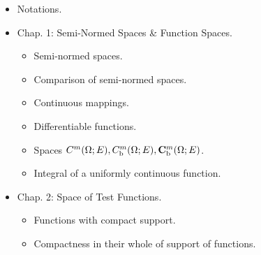 \documentclass{article}
\begin{document}
\begin{enumerate}
\begin{itemize}
		{\bf Utility of distributions.} Main advantage of distribution: distributions provide derivatives of all continuous or integrable functions, even those which are not differentiable, \& thus broaden scope of application of differential calculus. Especially useful for solving PDEs.
		
		To this end, a family of objects, the distributions, is defined, with following properties:
		\begin{itemize}
			\item Any continuous function is a distribution.
			\item Any distribution has partial derivatives, which are distributions.
			\item For a differentiable function, find conventional derivatives.
			\item Any limit of distributions is a distribution.
			\item Any Cauchy sequence of distributions has a limit.
		\end{itemize}
		These properties may be roughly summarized by saying: space $\mathcal{D}'$ of distributions is the {\it completion w.r.t. derivation} of space $C$ of continuous functions. This construction, due to {\sc Laurent Schwartz}, is completed here for distributions on an open subset $\Omega$ of $\mathbb{R}^d$ with values in a Neumann space $E$, i.e., a sequentially complete separable semi-normed space. This includes values in a Banach or Fr\'echet space.
		\item {\sf Notations.}
		\item {\sf Chap. 1: Semi-Normed Spaces \& Function Spaces.}
		\begin{itemize}
			\item {\sf Semi-normed spaces.}
			\item {\sf Comparison of semi-normed spaces.}
			\item {\sf Continuous mappings.}
			\item {\sf Differentiable functions.}
			\item {\sf Spaces $C^m(\Omega;E),C_{\rm b}^m(\Omega;E),{\bf C}_{\rm b}^m(\Omega;E)$.}
			\item {\sf Integral of a uniformly continuous function.}
		\end{itemize}
		\item {\sf Chap. 2: Space of Test Functions.}
		\begin{itemize}
			\item {\sf Functions with compact support.}
			\item {\sf Compactness in their whole of support of functions.}

\end{itemize}
\end{itemize}
\end{enumerate}
\end{document}
